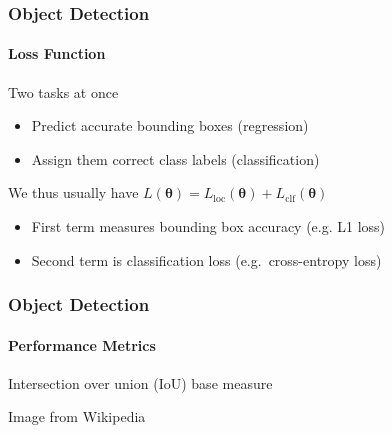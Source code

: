 \documentclass[xetex,professionalfont]{beamer}
\renewcommand\emph[1]{\textcolor{tuwcvl_cvl_blue}{#1}}
\newcommand{\bth}{\boldsymbol{\theta}}
\begin{document}
\begin{frame}
	\frametitle{Object Detection}
	\framesubtitle{Loss Function}

	Two tasks at once
	\begin{itemize}
		\item Predict accurate bounding boxes (regression)
		\item Assign them correct class labels (classification)
	\end{itemize}

	\bigskip

	We thus usually have $L(\bth)=L_{\text{loc}}(\bth)+L_{\text{clf}}(\bth)$
	\begin{itemize}
		\item First term measures bounding box accuracy (e.g. L1 loss)
		\item Second term is classification loss (e.g.~cross-entropy loss)
	\end{itemize}

\end{frame}


\begin{frame}
	\frametitle{Object Detection}
	\framesubtitle{Performance Metrics}

	\emph{Intersection over union} (\emph{IoU}) base measure

	\bigskip

	\begin{center}
		{\centering Image from Wikipedia}
	\end{center}

\end{frame}
\end{document}
